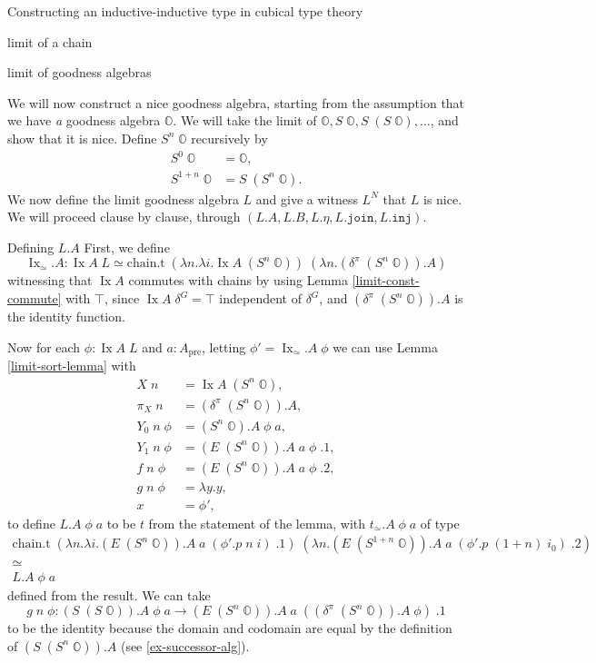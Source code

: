 \documentclass[acmsmall,review]{acmart}\settopmatter{printfolios=true,printccs=false,printacmref=false}
\DeclareMathOperator{\Ix}{Ix}
\newcommand{\pre}[1]{{#1}_\text{pre}}
\newcommand{\bbO}{\mathbb{O}}
\newcommand{\join}{\texttt{join}}
\newcommand{\inj}{\texttt{inj}}
\begin{document}
\begin{section}{Constructing an inductive-inductive type in cubical type theory}
\begin{subsection}{limit of a chain}
\end{subsection}

\begin{subsection}{limit of goodness algebras}\label{ex-limit-alg}

We will now construct a nice goodness algebra, starting from the assumption that we have \emph{a} goodness algebra $\bbO$. We will take the limit of $\bbO, S\;\bbO, S\;(S\;\bbO), \dots$, and show that it is nice. Define $S^n\;\bbO$ recursively by \begin{align*}S^0\;\bbO &= \bbO,\\S^{1+n}\;\bbO &= S\;(S^n\;\bbO).\end{align*}
We now define the limit goodness algebra $L$ and give a witness $L^N$ that $L$ is nice.
We will proceed clause by clause, through $(L.A, L.B, L.\eta, L.\join, L.\inj)$.

\begin{subsubsection}{Defining $L.A$}
First, we define \[\Ix_\simeq.A : \Ix A\; L \simeq \text{chain.t}\;(\lambda n.\lambda i.\Ix A\;(S^n\;\bbO))\;(\lambda n.(\delta^\pi\;(S^n\;\bbO)).A)\] witnessing that $\Ix A$ commutes with chains by using Lemma \ref{limit-const-commute} with $\top$, since $\Ix A\;\delta^G = \top$ independent of $\delta^G$, and $(\delta^\pi\;(S^n\;\bbO)).A$ is the identity function.

Now for each $\phi : \Ix A\;L$ and $a : \pre{A}$, letting $\phi' = \Ix_\simeq.A\;\phi$ we can use Lemma \ref{limit-sort-lemma} with \begin{align*}
X\;n &= \Ix A\;(S^n\;\bbO),\\
\pi_X\;n &= (\delta^\pi\;(S^n\;\bbO)).A,\\
Y_0\;n\;\phi &= (S^n\;\bbO).A\;\phi\;a,\\
Y_1\;n\;\phi &= (E\;(S^n\;\bbO)).A\;a\;\phi\;.1,\\
f\;n\;\phi &= (E\;(S^n\;\bbO)).A\;a\;\phi\;.2,\\
g\;n\;\phi &= \lambda y.y,\\
x &= \phi',
\end{align*}
to define $L.A\;\phi\;a$ to be $t$ from the statement of the lemma, with $t_\simeq.A\;\phi\;a$ of type \begin{gather*}
\text{chain.t}\;(\lambda n.\lambda i.(E\;(S^n\;\bbO)).A\;a\;(\phi'.p\;n\;i)\;.1)\;(\lambda n.(E\;(S^{1+n}\;\bbO)).A\;a\;(\phi'.p\;(1+n)\;i_0)\;.2)\\\simeq\\L.A\;\phi\;a
\end{gather*} defined from the result. We can take \[g\;n\;\phi : (S\;(S\;\bbO)).A\;\phi\;a \to (E\;(S^n\;\bbO)).A\;a\;((\delta^\pi\;(S^n\;\bbO)).A\;\phi)\;.1\] to be the identity because the domain and codomain are equal by the definition of $(S\;(S^n\;\bbO)).A$ (see \ref{ex-successor-alg}).
\end{subsubsection}


\end{subsection}
\end{section}
\end{document}
